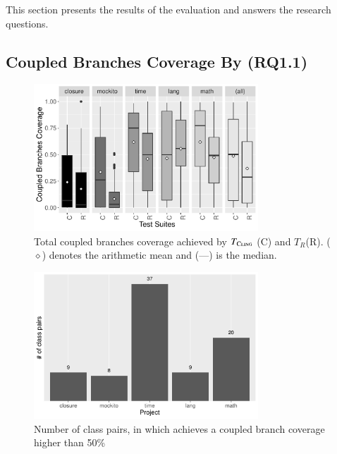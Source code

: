 
This section presents the results of the evaluation and answers the research questions.


\subsection{Coupled Branches Coverage By \cling (RQ1.1)}

    

\begin{figure}[t]
    \centering
    \includegraphics[width=0.75\textwidth]{papers/cling/figures/cbc-per-project.pdf}
    \caption{Total coupled branches coverage achieved by $T_{\textsc{Cling}}$ (C) and $T_R$(R). ($\diamond$) denotes the arithmetic mean and (---) is the median.}
    \label{fig:cbccoverage}
\end{figure}

\begin{figure}[t]
    \centering
    \includegraphics[width=0.75\textwidth]{papers/cling/figures/cbc-higher-than-50.pdf}
    \caption{Number of class pairs, in which \cling achieves a coupled branch coverage higher than 50\%}
    \label{fig:cbchigher50}
\end{figure}


